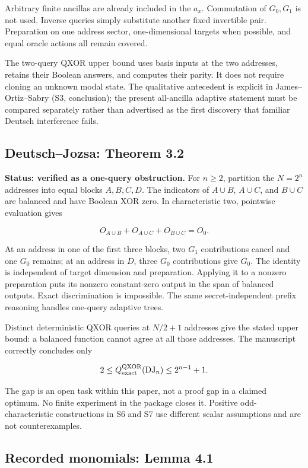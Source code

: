 \documentclass[
  11pt,
]{article}
\begin{document}
Arbitrary finite ancillas are already included in the \(a_x\).
Commutation of \(G_0,G_1\) is not used. Inverse queries simply
substitute another fixed invertible pair. Preparation on one address
sector, one-dimensional targets when possible, and equal oracle actions
all remain covered.

The two-query QXOR upper bound uses basis inputs at the two addresses,
retains their Boolean answers, and computes their parity. It does not
require cloning an unknown modal state. The qualitative antecedent is
explicit in James--Ortiz--Sabry (S3, conclusion); the present
all-ancilla adaptive statement must be compared separately rather than
advertised as the first discovery that familiar Deutsch interference
fails.

\subsection{Deutsch--Jozsa: Theorem 3.2}\label{deutschjozsa-theorem-3.2}

\textbf{Status: verified as a one-query obstruction.} For \(n\ge2\),
partition the \(N=2^n\) addresses into equal blocks \(A,B,C,D\). The
indicators of \(A\cup B\), \(A\cup C\), and \(B\cup C\) are balanced and
have Boolean XOR zero. In characteristic two, pointwise evaluation gives

\[
O_{A\cup B}+O_{A\cup C}+O_{B\cup C}=O_0.
\]

At an address in one of the first three blocks, two \(G_1\)
contributions cancel and one \(G_0\) remains; at an address in \(D\),
three \(G_0\) contributions give \(G_0\). The identity is independent of
target dimension and preparation. Applying it to a nonzero preparation
puts its nonzero constant-zero output in the span of balanced outputs.
Exact discrimination is impossible. The same secret-independent prefix
reasoning handles one-query adaptive trees.

Distinct deterministic QXOR queries at \(N/2+1\) addresses give the
stated upper bound: a balanced function cannot agree at all those
addresses. The manuscript correctly concludes only

\[
2\le Q_{\rm exact}^{\rm QXOR}(\mathrm{DJ}_n)\le 2^{n-1}+1.
\]

The gap is an open task within this paper, not a proof gap in a claimed
optimum. No finite experiment in the package closes it. Positive
odd-characteristic constructions in S6 and S7 use different scalar
assumptions and are not counterexamples.

\subsection{Recorded monomials: Lemma
4.1}\label{recorded-monomials-lemma-4.1}
\end{document}
